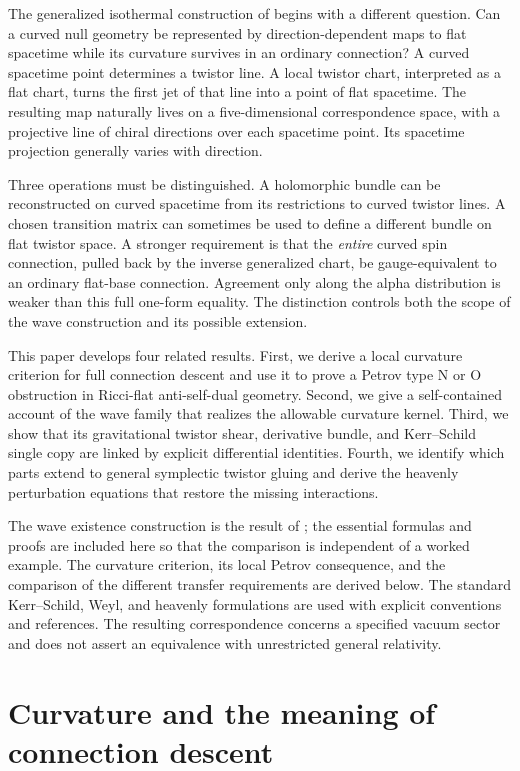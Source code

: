 \documentclass[11pt]{article}
\numberwithin{equation}{section}
\theoremstyle{definition}
\theoremstyle{remark}
\begin{document}
The generalized isothermal construction of \cite{BakerWave} begins with a different question. Can a curved null geometry be represented by direction-dependent maps to flat spacetime while its curvature survives in an ordinary connection? A curved spacetime point determines a twistor line. A local twistor chart, interpreted as a flat chart, turns the first jet of that line into a point of flat spacetime. The resulting map naturally lives on a five-dimensional correspondence space, with a projective line of chiral directions over each spacetime point. Its spacetime projection generally varies with direction.

Three operations must be distinguished. A holomorphic bundle can be reconstructed on curved spacetime from its restrictions to curved twistor lines. A chosen transition matrix can sometimes be used to define a different bundle on flat twistor space. A stronger requirement is that the \emph{entire} curved spin connection, pulled back by the inverse generalized chart, be gauge-equivalent to an ordinary flat-base connection. Agreement only along the alpha distribution is weaker than this full one-form equality. The distinction controls both the scope of the wave construction and its possible extension.

This paper develops four related results. First, we derive a local curvature criterion for full connection descent and use it to prove a Petrov type N or O obstruction in Ricci-flat anti-self-dual geometry. Second, we give a self-contained account of the wave family that realizes the allowable curvature kernel. Third, we show that its gravitational twistor shear, derivative bundle, and Kerr--Schild single copy are linked by explicit differential identities. Fourth, we identify which parts extend to general symplectic twistor gluing and derive the heavenly perturbation equations that restore the missing interactions.

The wave existence construction is the result of \cite{BakerWave}; the essential formulas and proofs are included here so that the comparison is independent of a worked example. The curvature criterion, its local Petrov consequence, and the comparison of the different transfer requirements are derived below. The standard Kerr--Schild, Weyl, and heavenly formulations are used with explicit conventions and references. The resulting correspondence concerns a specified vacuum sector and does not assert an equivalence with unrestricted general relativity.

\section{Curvature and the meaning of connection descent}\label{sec:descent}
\end{document}
